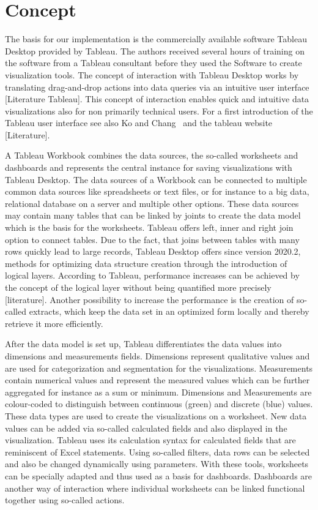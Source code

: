 \documentclass[aac,crcready]{iosart2x}
\begin{document}
\section{Concept}\label{s3}
%
The basis for our implementation is the commercially available software Tableau Desktop provided by Tableau\textregistered. The authors received several hours of training on the software from a Tableau consultant before they used the Software to create visualization tools. 
The concept of interaction with Tableau Desktop works by translating drag-and-drop actions into data queries via an intuitive user interface [Literature Tableau]. This concept of interaction enables quick and intuitive data visualizations also for non primarily technical users. For a first introduction of the Tableau user interface see also Ko and Chang~\cite{Ko.2017} and the tableau website [Literature].

A Tableau Workbook combines the data sources, the so-called worksheets and dashboards and represents the central instance for saving visualizations with Tableau Desktop. The data sources of a Workbook can be connected to multiple common data sources like spreadsheets or text files, or for instance to a big data, relational database on a server and multiple other options. These data sources may contain many tables that can be linked by joints to create the data model which is the basis for the worksheets. Tableau offers left, inner and right join option to connect tables. Due to the fact, that joins between tables with many rows quickly lead to large records, Tableau Desktop offers since version 2020.2, methods for optimizing data structure creation through the introduction of logical layers. According to Tableau, performance increases can be achieved by the concept of the logical layer without being quantified more precisely [literature]. Another possibility to increase the performance is the creation of so-called extracts, which keep the data set in an optimized form locally and thereby retrieve it more efficiently.

After the data model is set up, Tableau differentiates the data values into dimensions and measurements fields. Dimensions represent qualitative values and are used for categorization and segmentation for the visualizations. Measurements contain numerical values and represent the measured values which can be further aggregated for instance as a sum or minimum. Dimensions and Measurements are colour-coded to distinguish between continuous (green) and discrete (blue) values. These data types are used to create the visualizations on a worksheet. New data values can be added via so-called calculated fields and also displayed in the visualization. Tableau uses its calculation syntax for calculated fields that are reminiscent of Excel statements. Using so-called filters, data rows can be selected and also be changed dynamically using parameters. With these tools, worksheets can be specially adapted and thus used as a basis for dashboards. Dashboards are another way of interaction where individual worksheets can be linked functional together using so-called actions.
\end{document}
